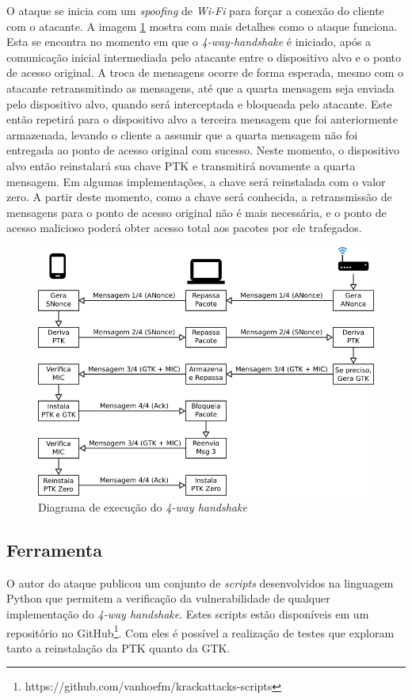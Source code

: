 \documentclass[12pt]{article}
\begin{document}
O ataque se inicia com um \textit{spoofing} de \textit{Wi-Fi} para forçar a conexão do cliente com o atacante. A imagem \ref{fig:ataque} mostra com mais detalhes como o ataque funciona. Esta se encontra no momento em que o \textit{4-way-handshake} é iniciado, após a comunicação inicial intermediada pelo atacante entre o dispositivo alvo e o ponto de acesso original. A troca de mensagens ocorre de forma esperada, mesmo com o atacante retransmitindo as mensagens, até que a quarta mensagem seja enviada pelo dispositivo alvo, quando será interceptada e bloqueada pelo atacante. Este então repetirá para o dispositivo alvo a terceira mensagem que foi anteriormente armazenada, levando o cliente a assumir que a quarta mensagem não foi entregada ao ponto de acesso original com sucesso. Neste momento, o dispositivo alvo então reinstalará sua chave PTK e transmitirá novamente a quarta mensagem. Em algumas implementações, a chave será reinstalada com o valor zero. A partir deste momento, como a chave será conhecida, a retransmissão de mensagens para o ponto de acesso original não é mais necessária, e o ponto de acesso malicioso poderá obter acesso total aos pacotes por ele trafegados.

\begin{figure}[H]
	\begin{center}
    	\includegraphics[width=15cm]{Ataque.png}
    	\caption{Diagrama de execução do \textit{4-way handshake}}
    	\label{fig:ataque}
	\end{center}		
\end{figure}

\subsection{Ferramenta}
O autor do ataque publicou um conjunto de \textit{scripts} desenvolvidos na linguagem Python que permitem a verificação da vulnerabilidade de qualquer implementação do \textit{4-way handshake}. Estes scripts estão disponíveis em um repositório no GitHub\footnote{https://github.com/vanhoefm/krackattacks-scripts}. Com eles é possível a realização de testes que exploram tanto a reinstalação da PTK quanto da GTK.
\end{document}
